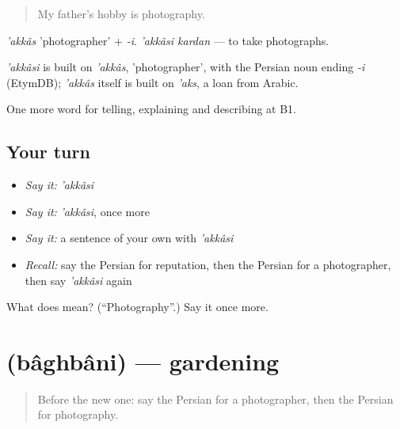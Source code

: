 \begin{quote}
My father's hobby is photography.
\end{quote}

\emph{'akkâs} 'photographer' + \emph{-i}. \emph{'akkâsi kardan} — to take photographs.

\begin{cousinweb}
\emph{'akkâsi} is built on \emph{'akkâs}, 'photographer', with the Persian noun ending \emph{-i} (EtymDB); \emph{'akkâs} itself is built on \emph{'aks}, a loan from Arabic.
\end{cousinweb}

\begin{grammarlens}[title={What you've built}]
One more word for telling, explaining and describing at B1.
\end{grammarlens}

\subsection*{Your turn}
\begin{itemize}
\raggedright
  \item \emph{Say it:} \emph{'akkâsi}
  \item \emph{Say it:} \emph{'akkâsi}, once more
  \item \emph{Say it:} a sentence of your own with \emph{'akkâsi}
  \item \emph{Recall:} say the Persian for reputation, then the Persian for a photographer, then say \emph{'akkâsi} again
\end{itemize}

\begin{tcolorbox}[breakable,colback=teal!4,colframe=teal!35!black,title={Before you move on}]
What does  mean? (\textquotedblleft{}Photography\textquotedblright{}.) Say it once more.
\end{tcolorbox}
\section[\texorpdfstring{\fa{باغبانی} (bâghbâni)}{باغبانی (bâghbâni)}]{ (bâghbâni) — gardening}

\label{lesson:FA-C507-baghbani}



\begin{quote}
Before the new one: say the Persian for a photographer, then the Persian for photography.
\end{quote}

